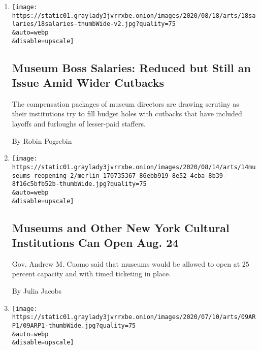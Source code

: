 \begin{enumerate}
\def\labelenumi{\arabic{enumi}.}
\item
  \href{/2020/08/18/arts/design/museum-leader-salaries-pay-disparity.html}{}

  \texttt{[image: https://static01.graylady3jvrrxbe.onion/images/2020/08/18/arts/18salaries/18salaries-thumbWide-v2.jpg?quality=75\\\&auto=webp\\\&disable=upscale]}

  \hypertarget{museum-boss-salaries-reduced-but-still-an-issue-amid-wider-cutbacks}{%
  \subsection{Museum Boss Salaries: Reduced but Still an Issue Amid
  Wider
  Cutbacks}\label{museum-boss-salaries-reduced-but-still-an-issue-amid-wider-cutbacks}}

  The compensation packages of museum directors are drawing scrutiny as
  their institutions try to fill budget holes with cutbacks that have
  included layoffs and furloughs of lesser-paid staffers.

  By Robin Pogrebin
\item
  \href{/2020/08/14/arts/design/nyc-museums-reopening-covid-19.html}{}

  \texttt{[image: https://static01.graylady3jvrrxbe.onion/images/2020/08/14/arts/14museums-reopening-2/merlin\_170735367\_86ebb919-8e52-4cba-8b39-8f16c5bfb52b-thumbWide.jpg?quality=75\\\&auto=webp\\\&disable=upscale]}

  \hypertarget{museums-and-other-new-york-cultural-institutions-can-open-aug-24}{%
  \subsection{Museums and Other New York Cultural Institutions Can Open
  Aug.
  24}\label{museums-and-other-new-york-cultural-institutions-can-open-aug-24}}

  Gov. Andrew M. Cuomo said that museums would be allowed to open at 25
  percent capacity and with timed ticketing in place.

  By Julia Jacobs
\item
  \href{/2020/07/09/arts/design/sophie-taeuber-arp-exhibition.html}{}

  \texttt{[image: https://static01.graylady3jvrrxbe.onion/images/2020/07/10/arts/09ARP1/09ARP1-thumbWide.jpg?quality=75\\\&auto=webp\\\&disable=upscale]}

  \hypertarget{a-swiss-dada-pioneer-finally-gets-her-spotlight}{%
}
\end{enumerate}
